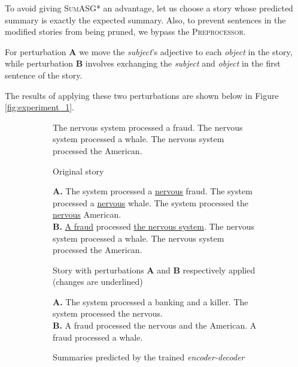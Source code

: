 To avoid giving \textsc{SumASG*} an advantage, let us choose a story whose predicted summary is exactly the expected summary. Also, to prevent sentences in the modified stories from being pruned, we bypass the \textsc{Preprocessor}.

For perturbation \textbf{A} we move the \textit{subject}'s adjective to each \textit{object} in the story, while perturbation \textbf{B} involves exchanging the \textit{subject} and \textit{object} in the first sentence of the story.

The results of applying these two perturbations are shown below in Figure \ref{fig:experiment_1}.

\begin{figure}[H]
\begin{subfigure}{\textwidth}
\begin{displayquote}
The nervous system processed a fraud. The nervous system processed a whale. The nervous system processed the American.
\end{displayquote}
\caption{Original story}
\vspace{\baselineskip}
\end{subfigure}
\begin{subfigure}{\textwidth}
\begin{displayquote}
\textbf{A.} The system processed a \underline{nervous} fraud. The system processed a \underline{nervous} whale. The system processed the \underline{nervous} American. \\
\textbf{B.} \underline{A fraud} processed \underline{the nervous system}. The nervous system processed a whale. The nervous system processed the American.
\end{displayquote}
\caption{Story with perturbations \textbf{A} and \textbf{B} respectively applied (changes are underlined)}
\vspace{\baselineskip}
\end{subfigure}
\begin{subfigure}{\textwidth}
\begin{displayquote}
\textbf{A.} The system processed a banking and a killer. The system processed the nervous. \\
\textbf{B.} A fraud processed the nervous and the American. A fraud processed a whale.
\end{displayquote}
\caption{Summaries predicted by the trained \textit{encoder-decoder}}
\vspace{\baselineskip}
\end{subfigure}
\begin{subfigure}{\textwidth}

\end{subfigure}
\end{figure}
